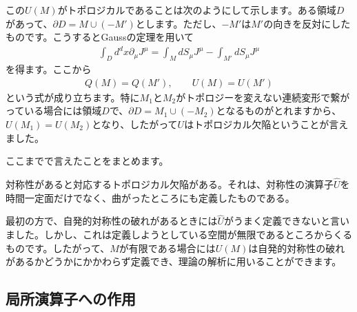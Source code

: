 \documentclass[report,paper=a4, fontsize=12pt, line_length=16cm, number_of_lines=33,dvipdfmx]{jlreq}
\numberwithin{equation}{chapter}
\newcommand{\del}{\partial}
\newcommand{\Uh}{\widehat{U}}
\begin{document}
この$U(M)$がトポロジカルであることは次のようにして示します。ある領域$D$があって、$\del D=M\cup (-M')$とします。ただし、$-M'$は$M'$の向きを反対にしたものです。こうするとGaussの定理を用いて
\begin{align}
  \int_{D}d^d x \del_{\mu}J^{\mu}
  =\int_{M}dS_{\mu}J^{\mu}-\int_{M'}dS_{\mu}J^{\mu}
\end{align}
を得ます。ここから
\begin{align}
  Q(M)=Q(M'),\qquad U(M)=U(M')
\end{align}
という式が成り立ちます。特に$M_1$と$M_2$がトポロジーを変えない連続変形で繋がっている場合には領域$D$で、$\del D=M_1\cup (-M_2)$となるものがとれますから、$U(M_1)=U(M_2)$となり、したがって$U$はトポロジカル欠陥ということが言えました。

ここまでで言えたことをまとめます。
\begin{emphasize}
  対称性があると対応するトポロジカル欠陥がある。それは、対称性の演算子$\Uh$を時間一定面だけでなく、曲がったところにも定義したものである。
\end{emphasize}
最初の方で、自発的対称性の破れがあるときには$\Uh$がうまく定義できないと言いました。しかし、これは定義しようとしている空間が無限であるところからくるものです。したがって、$M$が有限である場合には$U(M)$は自発的対称性の破れがあるかどうかにかかわらず定義でき、理論の解析に用いることができます。

\subsection{局所演算子への作用}
\end{document}

